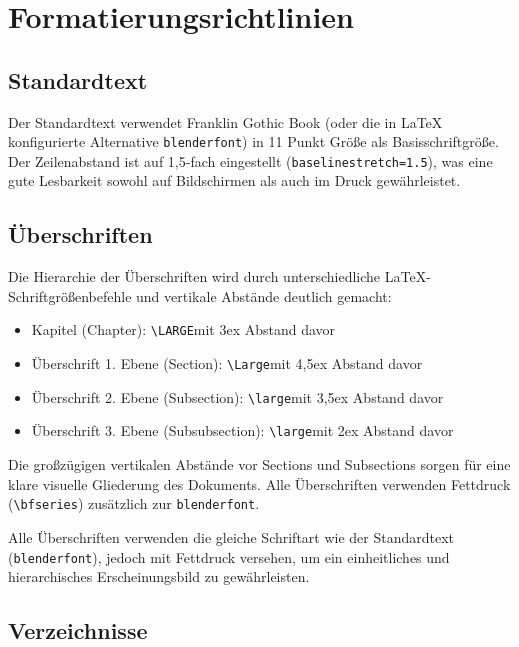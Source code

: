 \section{Formatierungsrichtlinien}
\label{sec:formatierungsrichtlinien}

\subsection*{Standardtext}
\label{subsec:standardtext}

Der Standardtext verwendet Franklin Gothic Book (oder die in \LaTeX{} konfigurierte Alternative \texttt{blenderfont}) in 11 Punkt Größe als Basisschriftgröße. Der Zeilenabstand ist auf 1,5-fach eingestellt (\texttt{baselinestretch=1.5}), was eine gute Lesbarkeit sowohl auf Bildschirmen als auch im Druck gewährleistet.

\subsection*{Überschriften}
\label{subsec:ueberschriften_format}

Die Hierarchie der Überschriften wird durch unterschiedliche \LaTeX{}-Schriftgrößenbefehle und vertikale Abstände deutlich gemacht:
\begin{itemize}
	\item Kapitel (Chapter): \texttt{\textbackslash LARGE}mit 3ex Abstand davor
	\item Überschrift 1. Ebene (Section): \texttt{\textbackslash Large}mit 4,5ex Abstand davor
	\item Überschrift 2. Ebene (Subsection): \texttt{\textbackslash large}mit 3,5ex Abstand davor
	\item Überschrift 3. Ebene (Subsubsection): \texttt{\textbackslash large}mit 2ex Abstand davor
\end{itemize}

Die großzügigen vertikalen Abstände vor Sections und Subsections sorgen für eine klare visuelle Gliederung des Dokuments. Alle Überschriften verwenden Fettdruck (\texttt{\textbackslash bfseries}) zusätzlich zur \texttt{blenderfont}.

Alle Überschriften verwenden die gleiche Schriftart wie der Standardtext (\texttt{blenderfont}), jedoch mit Fettdruck versehen, um ein einheitliches und hierarchisches Erscheinungsbild zu gewährleisten.

\subsection*{Verzeichnisse}
\label{subsec:verzeichnisse_format}


